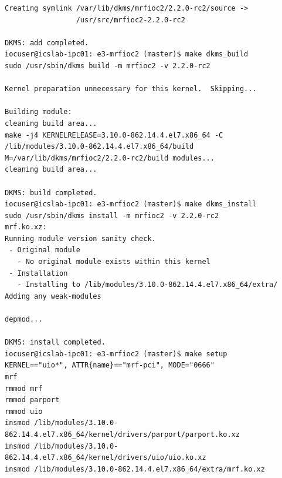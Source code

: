 \documentclass[11pt
  , a4paper
  , article
  , oneside
  , showtrims
]{memoir}
\begin{document}
{\begin{itemize}
\begin{lstlisting}[style=termstyle]
Creating symlink /var/lib/dkms/mrfioc2/2.2.0-rc2/source ->
                 /usr/src/mrfioc2-2.2.0-rc2

DKMS: add completed.
iocuser@icslab-ipc01: e3-mrfioc2 (master)$ make dkms_build
sudo /usr/sbin/dkms build -m mrfioc2 -v 2.2.0-rc2

Kernel preparation unnecessary for this kernel.  Skipping...

Building module:
cleaning build area...
make -j4 KERNELRELEASE=3.10.0-862.14.4.el7.x86_64 -C /lib/modules/3.10.0-862.14.4.el7.x86_64/build M=/var/lib/dkms/mrfioc2/2.2.0-rc2/build modules...
cleaning build area...

DKMS: build completed.
iocuser@icslab-ipc01: e3-mrfioc2 (master)$ make dkms_install
sudo /usr/sbin/dkms install -m mrfioc2 -v 2.2.0-rc2
mrf.ko.xz:
Running module version sanity check.
 - Original module
   - No original module exists within this kernel
 - Installation
   - Installing to /lib/modules/3.10.0-862.14.4.el7.x86_64/extra/
Adding any weak-modules

depmod...

DKMS: install completed.
iocuser@icslab-ipc01: e3-mrfioc2 (master)$ make setup
KERNEL=="uio*", ATTR{name}=="mrf-pci", MODE="0666"
mrf
rmmod mrf
rmmod parport
rmmod uio
insmod /lib/modules/3.10.0-862.14.4.el7.x86_64/kernel/drivers/parport/parport.ko.xz
insmod /lib/modules/3.10.0-862.14.4.el7.x86_64/kernel/drivers/uio/uio.ko.xz
insmod /lib/modules/3.10.0-862.14.4.el7.x86_64/extra/mrf.ko.xz



\end{lstlisting}
\end{itemize}}
\end{document}

